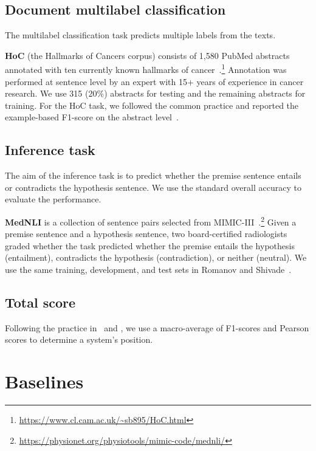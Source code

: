 \documentclass[11pt,a4paper]{article}
\begin{document}
\subsection{Document multilabel classification}

The multilabel classification task predicts multiple labels from the texts. 

\textbf{HoC} (the Hallmarks of Cancers corpus) consists of 1,580 PubMed abstracts annotated with ten currently known hallmarks of cancer~\cite{baker2016automatic}.\footnote{\url{https://www.cl.cam.ac.uk/~sb895/HoC.html}} Annotation was performed at sentence level by an expert with 15+ years of experience in cancer research. We use 315 (20\%) abstracts for testing and the remaining abstracts for training. For the HoC task, we followed the common practice and reported the example-based F1-score on the abstract level~\cite{zhang2014review,du2018ml}.

\subsection{Inference task}

The aim of the inference task is to predict whether the premise sentence entails or contradicts the hypothesis sentence. We use the standard overall accuracy to evaluate the performance.

\textbf{MedNLI} is a collection of sentence pairs selected from MIMIC-III~\cite{romanov2018lessons}.\footnote{\url{https://physionet.org/physiotools/mimic-code/mednli/}} Given a premise sentence and a hypothesis sentence, two board-certified radiologists graded whether the task predicted whether the premise entails the hypothesis (entailment), contradicts the hypothesis (contradiction), or neither (neutral). We use the same training, development, and test sets in Romanov and Shivade~\cite{romanov2018lessons}.

\subsection{Total score}

Following the practice in~\citet{wang2018glue} and \citet{lee2019biobert}, we use a macro-average of F1-scores and Pearson scores to determine a system's position.

\section{Baselines}
\end{document}
